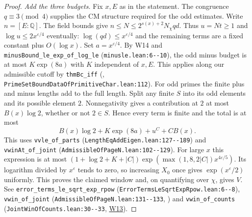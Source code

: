 \begin{proof}
\emph{Add the three budgets.} Fix $x,E$ as in the statement.
The congruence $q\equiv3\pmod4$ supplies the CM structure required
for the odd estimates. Write $n=[E:\mathbb Q]$.
The field bounds give $n\le N\le 2^{s(x)+2}N_\chi qd$.
Thus $u=Nt\ge1$ and $\log u\le 2x^{\varepsilon/4}$ eventually:
$\log(qd)\le x^{\varepsilon/4}$ and the remaining terms are a fixed
constant plus $O(\log x)$. Set $a=x^{\varepsilon/4}$.
By W14 and \nolinkurl{minusBound_le_exp_of_log_le}
(\nolinkurl{minusle.lean:6--10}), the odd minus budget is at most
$K\exp(8a)$ with $K$ independent of $x,E$. This applies along
our admissible cutoff by \nolinkurl{thmBc_iff} (,
\nolinkurl{PrimeSetBoundDataOfPrimitiveChar.lean:112}).
For odd primes the finite plus and minus lengths add to the full length.
Split any finite $S$ into its odd elements and its possible element $2$.
Nonnegativity gives a contribution at $2$ at most $B(x)\log2$,
whether or not $2\in S$. Hence every term is finite and the total is
at most
\[
 B(x)\log2+K\exp(8a)+u^C+C B(x).
\]
This uses \nolinkurl{vvle_of_parts} (\nolinkurl{LengthEqAddEigen.lean:127--189})
and \nolinkurl{vwinAt_of_joint} (\nolinkurl{AdmissibleOfPageN.lean:102--129}).
For large $x$ this expression is at most
$(1+\log2+K+|C|)\exp(\max(1,8,2|C|)x^{4\varepsilon/5})$.
Its logarithm divided by $x^\varepsilon$ tends to zero, so increasing
$X_0$ once gives $\exp(x^\varepsilon/2)$ uniformly. This proves the
claimed window and, on quantifying over $\chi$, gives $V$.
See \nolinkurl{error_terms_le_sqrt_exp_rpow}
(\nolinkurl{ErrorTermsLeSqrtExpRpow.lean:6--8}),
\nolinkurl{vwin_of_joint} (\nolinkurl{AdmissibleOfPageN.lean:131--133},
) and \nolinkurl{vwin_of_counts}
(\nolinkurl{JointWinOfCounts.lean:30--33}, \hyperref[sub:W13]{W13}).
\end{proof}
